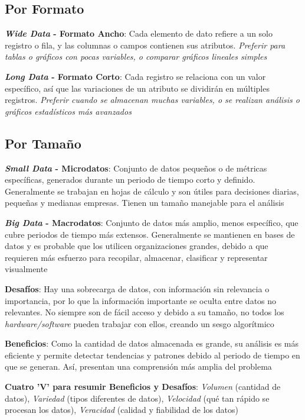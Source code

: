 \subsection{Por Formato}
\begin{description}
    \item {\textbf{\textit{Wide Data} - Formato Ancho}: Cada elemento de dato refiere a un solo registro o fila, y las columnas o campos contienen sus atributos. \textit{Preferir para tablas o gráficos con pocas variables, o comparar gráficos lineales simples}}
    \item {\textbf{\textit{Long Data} - Formato Corto}: Cada registro se relaciona con un valor específico, así que las variaciones de un atributo se dividirán en múltiples registros. \textit{Preferir cuando se almacenan muchas variables, o se realizan análisis o gráficos estadísticos más avanzados}}
\end{description}

\subsection{Por Tamaño}
\begin{description}
    \item {\textbf{\textit{Small Data} - Microdatos}: Conjunto de datos pequeños o de métricas específicas, generados durante un periodo de tiempo corto y definido. Generalmente se trabajan en hojas de cálculo y son útiles para decisiones diarias, pequeñas y medianas empresas. Tienen un tamaño manejable para el análisis}
    \item {\textbf{\textit{Big Data} - Macrodatos}: Conjunto de datos más amplio, menos específico, que cubre periodos de tiempo más extensos. Generalmente se mantienen en bases de datos y es probable que los utilicen organizaciones grandes, debido a que requieren más esfuerzo para recopilar, almacenar, clasificar y representar visualmente
    \begin{description}
        \item {\textbf{Desafíos}: Hay una sobrecarga de datos, con información sin relevancia o importancia, por lo que la información importante se oculta entre datos no relevantes. No siempre son de fácil acceso y debido a su tamaño, no todos los \textit{hardware/software} pueden trabajar con ellos, creando un sesgo algorítmico}
        \item {\textbf{Beneficios}: Como la cantidad de datos almacenada es grande, su análisis es más eficiente y permite detectar tendencias y patrones debido al periodo de tiempo en que se generan. Así, presentan una comprensión más amplia del problema}
        \item {\textbf{Cuatro 'V' para resumir Beneficios y Desafíos}: \textit{Volumen} (cantidad de datos), \textit{Variedad} (tipos diferentes de datos), \textit{Velocidad} (qué tan rápido se procesan los datos), \textit{Veracidad} (calidad y fiabilidad de los datos)}
    \end{description}}
\end{description}
\newpage